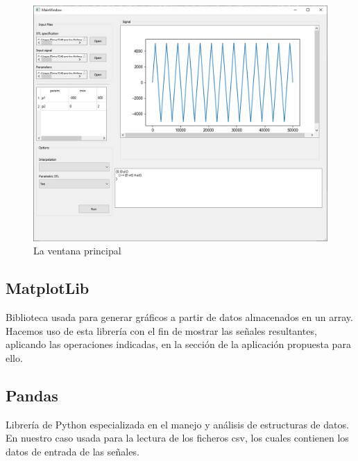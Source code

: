 \begin{figure}[htb]
\centering
  \includegraphics[width=1.0\linewidth]{images/gui} 
\caption{La ventana principal}
\label{fig:gui}
\end{figure}

 
 
 
 
\subsection{MatplotLib}
Biblioteca usada para generar gráficos a partir de datos almacenados en un array. Hacemos uso de esta librería con el fin de mostrar las señales resultantes, aplicando las operaciones indicadas, en la sección de la aplicación propuesta para ello. 
 
 
 
\subsection{Pandas}
Librería de Python especializada en el manejo y análisis de estructuras de datos. En nuestro caso usada para la lectura de los ficheros csv, los cuales contienen los datos de entrada de las señales.
 
